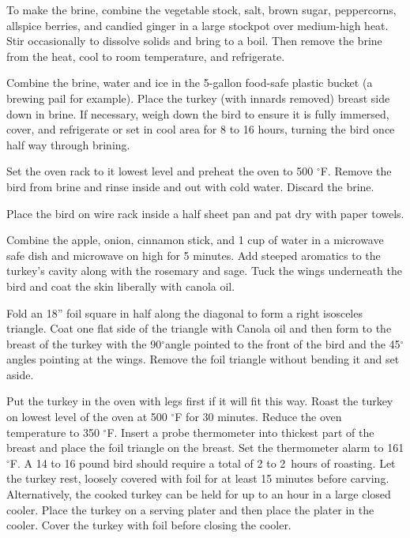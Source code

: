 \documentclass[letterpaper]{recipePMG}
\renewcommand{\deg}{$^\circ$}
\newcommand{\half}{\nicefrac{1}{2} \,}
\begin{document}
To make the brine, combine the vegetable stock, salt, brown sugar, peppercorns, allspice berries, and candied ginger in a large stockpot over medium-high heat. Stir occasionally to dissolve solids and bring to a boil. Then remove the brine from the heat, cool to room temperature, and refrigerate.  

Combine the brine, water and ice in the 5-gallon food-safe plastic bucket (a brewing pail for example). Place the turkey (with innards removed) breast side down in brine. If necessary, weigh down the bird to ensure it is fully immersed, cover, and refrigerate or set in cool area for 8 to 16 hours, turning the bird once half way through brining.

Set the oven rack to it lowest level and preheat the oven to 500 \deg F. Remove the bird from brine and rinse inside and out with cold water. Discard the brine. 

Place the bird on wire rack inside a half sheet pan and pat dry with paper towels.


Combine the apple, onion, cinnamon stick, and 1 cup of water in a microwave safe dish and microwave on high for 5 minutes. Add steeped aromatics to the turkey's cavity along with the rosemary and sage. Tuck the wings underneath the bird and coat the skin liberally with canola oil.  

Fold an 18'' foil square in half along the diagonal to form a right isosceles triangle. Coat one flat side of the triangle with Canola oil and then form to the breast of the turkey with the 90\deg angle pointed to the front of the bird and the 45\deg angles pointing at the wings.  Remove the foil triangle without bending it and set aside.


Put the turkey in the oven with legs first if it will fit this way. Roast the turkey on lowest level of the oven at 500 \deg F for 30 minutes. Reduce the oven temperature to 350 \deg F. Insert a probe thermometer into thickest part of the breast and place the foil triangle on the breast.  Set the thermometer alarm to 161 \deg F. A 14 to 16 pound bird should require a total of 2 to 2 \half hours of roasting. Let the turkey rest, loosely covered with foil for at least 15 minutes before carving. Alternatively, the cooked turkey can be held for up to an hour in a large closed cooler.  Place the turkey on a serving plater and then place the plater in the cooler. Cover the turkey with foil before closing the cooler.

\newpage
{}
\end{document}
